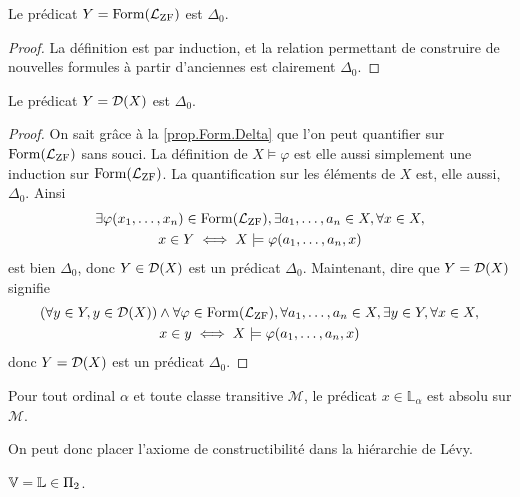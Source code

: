 \begin{property}\label{prop.Form.Delta}
  Le prédicat $Y = \operatorname{Form}(\mathcal L_{\operatorname{ZF}})$ est $\Delta_0$.
\end{property}

\begin{proof}
  La définition est par induction, et la relation permettant de construire
  de nouvelles formules à partir d'anciennes est clairement $\Delta_0$.
\end{proof}

\begin{property}
  Le prédicat $Y = \mathcal{D}(X)$ est $\Delta_0$.
\end{property}

\begin{proof}
  On sait grâce à la \cref{prop.Form.Delta} que l'on peut quantifier
  sur $\operatorname{Form}(\mathcal L_{\operatorname{ZF}})$ sans souci. La définition de
  $X\models \varphi$ est elle aussi simplement une induction sur
  $\operatorname{Form}(\mathcal L_{\operatorname{ZF}})$. La quantification sur les éléments de $X$ est,
  elle aussi, $\Delta_0$. Ainsi
  \begin{multline*}
    \exists \varphi(x_1,\ldots,x_n)\in\operatorname{Form}(\mathcal L_{\operatorname{ZF}}),
    \exists a_1,\ldots,a_n\in X, \forall x\in X, \\
    x\in Y \iff X\models \varphi(a_1,\ldots,a_n,x)
  \end{multline*}
  est bien $\Delta_0$, donc $Y\in \mathcal{D}(X)$ est un prédicat $\Delta_0$.
  Maintenant, dire que $Y = \mathcal{D}(X)$ signifie
  \begin{multline*}
    (\forall y \in Y, y \in \mathcal{D}(X)) \land
    \forall \varphi\in\operatorname{Form}(\mathcal L_{\operatorname{ZF}}),
    \forall a_1,\ldots,a_n\in X, \exists y \in Y, \forall x \in X,\\
    x \in y \iff X\models \varphi(a_1,\ldots,a_n,x)
  \end{multline*}
  donc $Y = \mathcal{D}(X)$ est un prédicat $\Delta_0$.
\end{proof}

\begin{corollary}
  Pour tout ordinal $\alpha$ et toute classe transitive $\mathcal M$, le
  prédicat $x\in \mathbb L_{\alpha}$ est absolu sur $\mathcal M$.
\end{corollary}

On peut donc placer l'axiome de constructibilité dans la hiérarchie de Lévy.

\begin{proposition}
  $\mathbb V = \mathbb L \in \Pi_2$.
\end{proposition}

